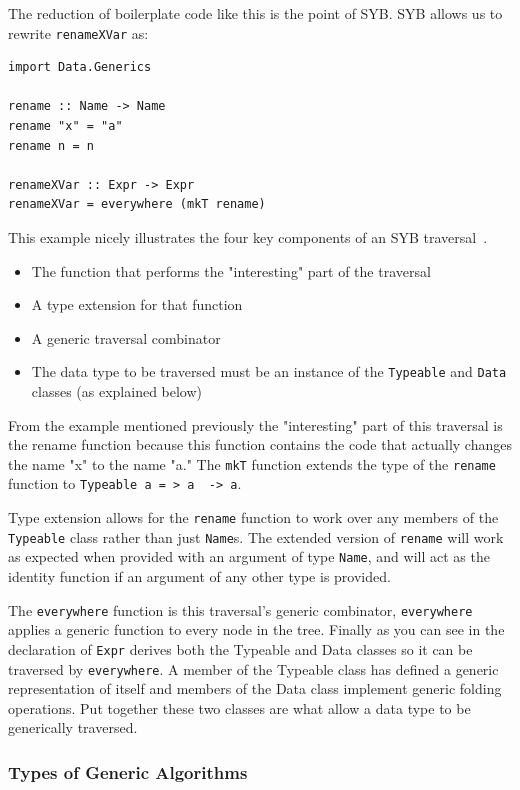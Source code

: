 	The reduction of boilerplate code like this is the point of SYB. SYB allows us to rewrite \texttt{renameXVar} as:
	
	\begin{verbatim}
import Data.Generics	
	
rename :: Name -> Name
rename "x" = "a"
rename n = n

renameXVar :: Expr -> Expr
renameXVar = everywhere (mkT rename)
	\end{verbatim} 
	
	This example nicely illustrates the four key components of an SYB traversal~\citep{syb}.

	\begin{itemize}
		\item The function that performs the "interesting" part of the traversal
		\item A type extension for that function
		\item A generic traversal combinator
		\item The data type to be traversed must be an instance of the \texttt{Typeable} and \texttt{Data} classes (as explained below)
	\end{itemize}
	
	From the example mentioned previously the "interesting" part of this traversal is the rename function because this function contains the code that actually changes the name "x" to the name "a." The \texttt{mkT} function extends the type of the \texttt{rename} function to \texttt{Typeable~a = > a~ -> a}. 
	
	Type extension allows for the \texttt{rename} function to work over any members of the \texttt{Typeable} class rather than just \texttt{Name}s. The extended version of \texttt{rename} will work as expected when provided with an argument of type \texttt{Name}, and will act as the identity function if an argument of any other type is provided.
	
	The \texttt{everywhere} function is this traversal's generic combinator, \texttt{everywhere} applies a generic function to every node in the tree. Finally as you can see in the declaration of \texttt{Expr} derives both the Typeable and Data classes so it can be traversed by \texttt{everywhere}. A member of the Typeable class has defined a generic representation of itself and members of the Data class implement generic folding operations. Put together these two classes are what allow a data type to be generically traversed. 
	
\subsubsection{Types of Generic Algorithms}

